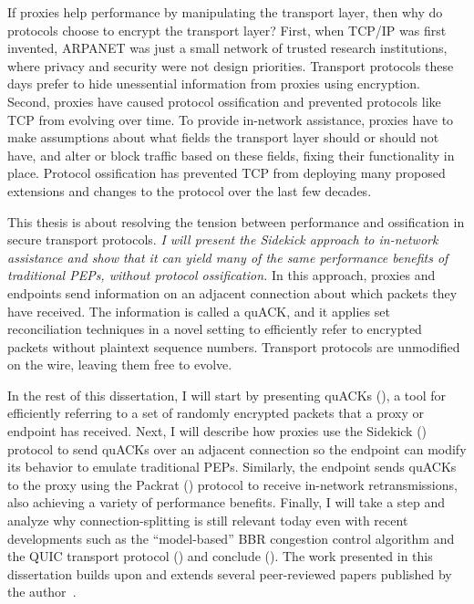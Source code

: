 If proxies help performance by manipulating the transport layer, then why do
protocols choose to encrypt the transport layer? First, when TCP/IP was first
invented, ARPANET was just a small network of trusted research institutions,
where privacy and security were not design priorities. Transport protocols
these days prefer to hide unessential information from proxies using
encryption. Second, proxies have caused protocol ossification and prevented
protocols like TCP from evolving over time. To provide in-network assistance,
proxies have to make assumptions about what fields the transport layer should
or should not have, and alter or block traffic based on these fields, fixing
their functionality in place. Protocol ossification has prevented TCP from
deploying many proposed extensions and changes to the protocol over the last
few decades.

This thesis is about resolving the tension between performance and ossification
in secure transport protocols. \textit{I will present the
Sidekick approach to in-network assistance and show that it can yield many of
the same performance benefits of traditional PEPs, without protocol
ossification.} In this approach, proxies and endpoints send information on an
adjacent connection about which packets they have received. The information is
called a quACK, and it applies set reconciliation techniques in a novel setting
to efficiently refer to encrypted packets without plaintext sequence numbers.
Transport protocols are unmodified on the wire, leaving them free to evolve.

In the rest of this dissertation, I will start by presenting quACKs
(), a tool for efficiently referring to a set of randomly
encrypted packets that a proxy or endpoint has received. Next, I will describe
how proxies use the Sidekick () protocol to send quACKs over
an adjacent connection so the endpoint can modify its behavior to emulate
traditional PEPs. Similarly, the endpoint sends quACKs to the proxy using the
Packrat () protocol to receive in-network retransmissions,
also achieving a variety of performance benefits. Finally, I will take a step
and analyze why connection-splitting is still relevant today even with recent
developments such as the ``model-based'' BBR congestion control algorithm and
the QUIC transport protocol () and conclude
().
The work presented in this dissertation builds upon and extends several
peer-reviewed papers published by the author~\cite{yuan2022sidecar,yuan2024sidekick,yuan2025internet}.


